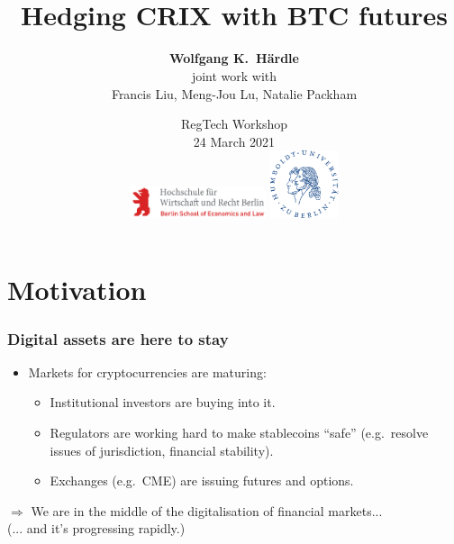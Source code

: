 \documentclass[10pt,mathserif]{beamer}
\title{\bigskip\bigskip\bigskip\\
  \bfseries{Hedging CRIX with BTC futures}}
\author{{\bf Wolfgang K.\ H\"ardle\medskip\\} joint work with\\ Francis Liu,
  Meng-Jou Lu, Natalie Packham}
\date{
  \vspace*{-1.5\baselineskip}
  RegTech Workshop\\
  24 March 2021\\

\hspace*{-.75cm}
  \includegraphics[width=4cm]{HWR_Logo_RGB.pdf}
  \hspace*{1cm}
  \hspace*{3.55cm}
    \includegraphics[width=2cm]{HU.png}
}
\renewcommand{\(}{\begin{columns}}
\renewcommand{\)}{\end{columns}}
\newcommand{\<}[1]{\begin{column}{#1}}
\renewcommand{\>}{\end{column}}
\theoremstyle{definition}
\begin{document}
\frame{ \thispagestyle{empty} \titlepage }

\logo{}




\setcounter{tocdepth}{2}%


\section{Motivation}

\begin{frame}
  \frametitle{Digital assets are here to stay}
  \begin{itemize}
      \addtolength{\itemsep}{3pt}
  \item Markets for cryptocurrencies are maturing:
    \begin{itemize}
      \addtolength{\itemsep}{3pt}
      \item Institutional investors are buying into it. 
      \item Regulators are working hard to make stablecoins “safe”
        (e.g.\ resolve issues of jurisdiction, financial stability).
      \item Exchanges (e.g.\ CME) are issuing futures and options. 
      \end{itemize}
    \end{itemize}
    \vspace*{.5\baselineskip}
    
  $\Longrightarrow$ We are in the middle of the digitalisation
  of financial markets...
  \\
  \pause
  \hfill (... and it's progressing rapidly.)
\end{frame}
\end{document}

